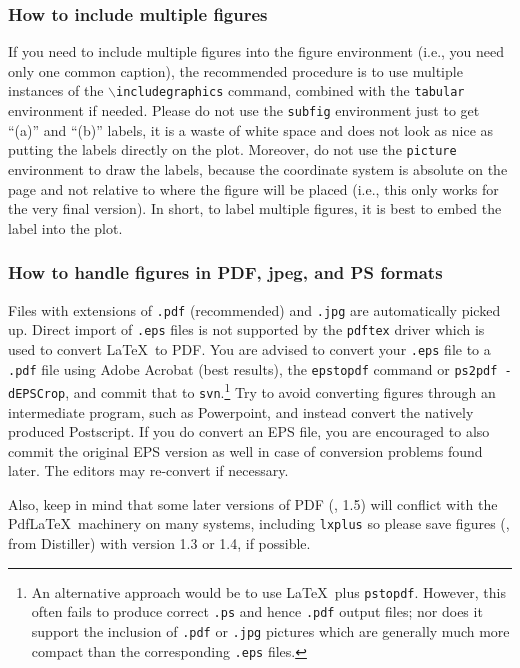 \subsubsection{How to include multiple figures}

If you need to include multiple figures into the figure environment
(i.e., you need only one common caption), the recommended procedure is to
use multiple instances of the \texttt{$\backslash$includegraphics} command, combined
with the \texttt{tabular} environment if needed. Please do not use the
\texttt{subfig} environment just to get ``(a)'' and ``(b)'' labels, it
is a waste of white space and does not look as nice as putting the
labels directly on the plot. Moreover, do not use the \texttt{picture}
environment to draw the labels, because the coordinate system is
absolute on the page and not relative to where the figure will be
placed (i.e., this only works for the very final version). In short, to
label multiple figures, it is best to embed the label into the plot.



\subsubsection{How to handle figures in PDF, jpeg, and PS formats}

Files with extensions of \texttt{.pdf} (recommended) and \texttt{.jpg}
are automatically picked up.
Direct import of \texttt{.eps} files is not
supported by the \texttt{pdftex} driver which is used to convert
\LaTeX\ to PDF.
You are advised to convert your \texttt{.eps} file to a \texttt{.pdf} file
using Adobe Acrobat (best results), the \texttt{epstopdf}
command or \texttt{ps2pdf -dEPSCrop}, and commit that to \texttt{svn}.\footnote{An alternative approach
would be to use \LaTeX\ plus \texttt{pstopdf}.
However, this often fails to produce correct \texttt{.ps} and hence
\texttt{.pdf} output files; nor does it support the inclusion of
\texttt{.pdf} or \texttt{.jpg} pictures which are generally much more compact
than the corresponding \texttt{.eps} files.
}
Try to avoid converting figures through an intermediate program, such
as Powerpoint, and instead convert the natively produced
Postscript. If you do convert an EPS file, you are encouraged to also
commit the original EPS version as well in case of conversion
problems found later. The editors may re-convert if necessary.


Also, keep in mind that some later versions of PDF (\eg, 1.5) will
conflict with the Pdf\LaTeX\ machinery on many systems, including
\texttt{lxplus} so please save figures (\eg, from Distiller) with version
1.3 or 1.4, if possible.


